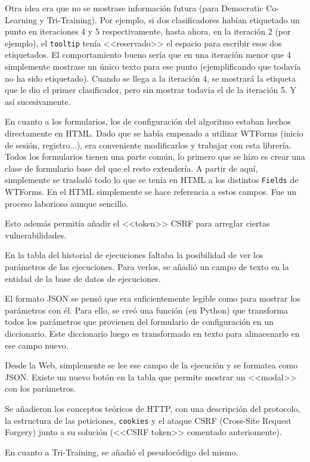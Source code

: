 Otra idea era que no se mostrase información futura (para Democratic Co-Learning
y Tri-Training). Por ejemplo, si dos clasificadores habían etiquetado un punto
en iteraciones 4 y 5 respectivamente, hasta ahora, en la iteración 2 (por
ejemplo), el \texttt{tooltip} tenía <<reservado>> el espacio para escribir esos
dos etiquetados. El comportamiento bueno sería que en una iteración menor que 4
simplemente mostrase un único texto para ese punto (ejemplificando que todavía
no ha sido etiquetado). Cuando se llega a la iteración 4, se mostrará la
etiqueta que le dio el primer clasificador, pero sin mostrar todavía el de la
iteración 5. Y así sucesivamente.

En cuanto a los formularios, los de configuración del algoritmo estaban hechos
directamente en HTML. Dado que se había empezado a utilizar WTForms (inicio de
sesión, registro...), era conveniente modificarlos y trabajar con esta librería.
Todos los formularios tienen una parte común, lo primero que se hizo es crear
una clase de formulario base del que el resto extendería. A partir de aquí,
simplemente se trasladó todo lo que se tenía en HTML a los distintos
\texttt{Fields} de WTForms. En el HTML simplemente se hace referencia a estos
campos. Fue un proceso laborioso aunque sencillo.

Esto además permitía añadir el <<token>> CSRF para arreglar ciertas
vulnerabilidades.

En la tabla del historial de ejecuciones faltaba la posibilidad de ver los
parámetros de las ejecuciones. Para verlos, se añadió un campo de texto en la
entidad de la base de datos de ejecuciones. 

El formato JSON se pensó que era suficientemente legible como para mostrar los
parámetros con él. Para ello, se creó una función (en Python) que transforma
todos los parámetros que provienen del formulario de configuración en un
diccionario. Este diccionario luego es transformado en texto para almacenarlo en
ese campo nuevo.

Desde la Web, simplemente se lee ese campo de la ejecución y se formatea como
JSON. Existe un nuevo botón en la tabla que permite mostrar un <<modal>> con los
parámetros.

Se añadieron los conceptos teóricos de HTTP, con una descripción del protocolo,
la estructura de las peticiones, \texttt{cookies} y el ataque CSRF (Cross-Site
Request Forgery) junto a su solución (<<CSRF token>> comentado anteriomente).

En cuanto a Tri-Training, se añadió el pseudocódigo del mismo.

